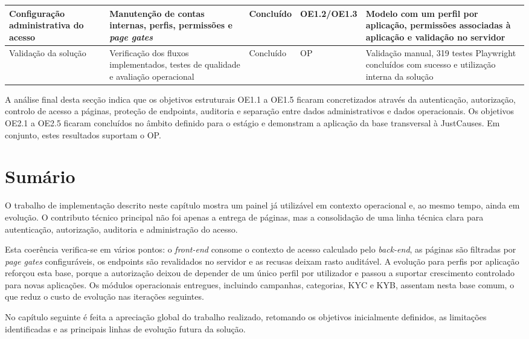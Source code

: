 \begin{table}[H]
\begin{center}
\begin{tabular}{|>{\raggedright\arraybackslash}p{2.3cm}|>{\raggedright\arraybackslash}p{3.2cm}|>{\raggedright\arraybackslash}p{1.2cm}|>{\raggedright\arraybackslash}p{1.8cm}|>{\raggedright\arraybackslash}p{3.7cm}|}
Configuração administrativa do acesso & Manutenção de contas internas, perfis, permissões e \textit{page gates} & Concluído & OE1.2/OE1.3 & Modelo com um perfil por aplicação, permissões associadas à aplicação e validação no servidor \\ \hline
Validação da solução & Verificação dos fluxos implementados, testes de qualidade e avaliação operacional & Concluído & OP & Validação manual, 319 testes Playwright concluídos com sucesso e utilização interna da solução \\ \hline
\end{tabular}
\endgroup
\end{center}
\end{table}

A análise final desta secção indica que os objetivos estruturais OE1.1 a OE1.5 ficaram concretizados através da autenticação, autorização, controlo de acesso a páginas, proteção de endpoints, auditoria e separação entre dados administrativos e dados operacionais. Os objetivos OE2.1 a OE2.5 ficaram concluídos no âmbito definido para o estágio e demonstram a aplicação da base transversal à JustCauses. Em conjunto, estes resultados suportam o OP.

\section{Sumário}
\label{sec:sumario_cap4}

O trabalho de implementação descrito neste capítulo mostra um painel já utilizável em contexto operacional e, ao mesmo tempo, ainda em evolução. O contributo técnico principal não foi apenas a entrega de páginas, mas a consolidação de uma linha técnica clara para autenticação, autorização, auditoria e administração do acesso.

Esta coerência verifica-se em vários pontos: o \textit{front-end} consome o contexto de acesso calculado pelo \textit{back-end}, as páginas são filtradas por \textit{page gates} configuráveis, os endpoints são revalidados no servidor e as recusas deixam rasto auditável. A evolução para perfis por aplicação reforçou esta base, porque a autorização deixou de depender de um único perfil por utilizador e passou a suportar crescimento controlado para novas aplicações. Os módulos operacionais entregues, incluindo campanhas, categorias, \gls{KYC} e \gls{KYB}, assentam nesta base comum, o que reduz o custo de evolução nas iterações seguintes.

No capítulo seguinte é feita a apreciação global do trabalho realizado, retomando os objetivos inicialmente definidos, as limitações identificadas e as principais linhas de evolução futura da solução.
